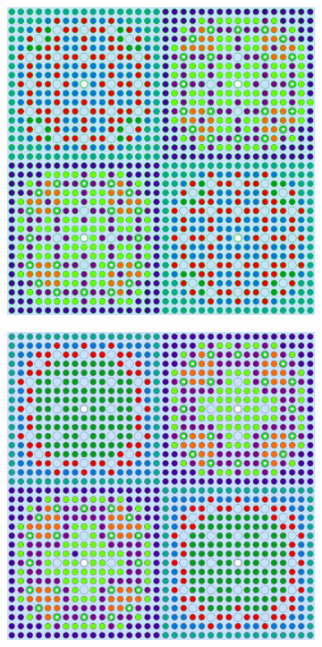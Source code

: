 \begin{figure}[h!]
\begin{subfigure}{0.48\textwidth}
  \caption{}
  \label{fig:chap10-2x2-combined-2}
\end{subfigure}
\begin{subfigure}{0.48\textwidth}
  \centering
  \includegraphics[width=0.9\linewidth]{figures/unsupervised/geometries/with-features/4-clusters/pinch/2x2}
  \caption{}
  \label{fig:chap10-2x2-pinch-4}
\end{subfigure}%
\begin{subfigure}{0.48\textwidth}
  \centering
  \includegraphics[width=0.9\linewidth]{figures/unsupervised/geometries/with-features/4-clusters/combined/2x2}

\end{subfigure}
\end{figure}
